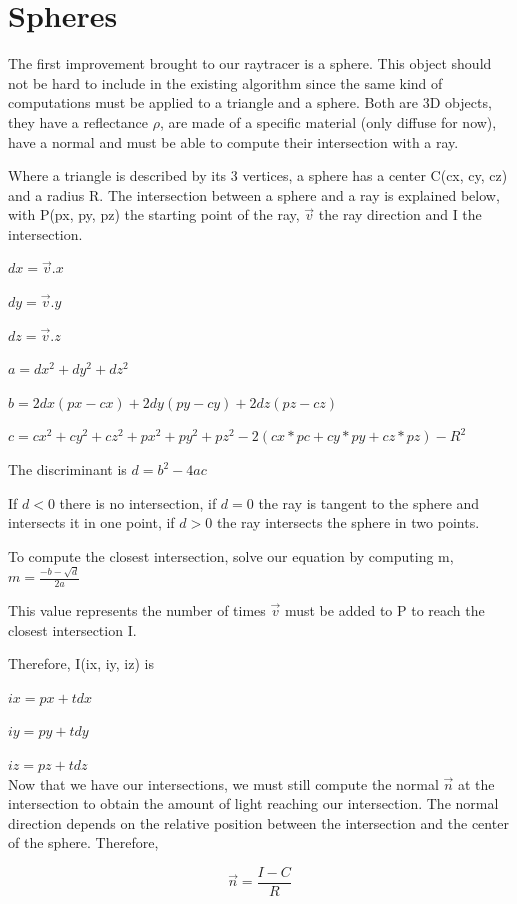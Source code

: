\section{Spheres}
The first improvement brought to our raytracer is a sphere. This object should not be hard to include in the existing algorithm since the same kind of computations must be applied to a triangle and a sphere. Both are 3D objects, they have a reflectance $\rho$, are made of a specific material (only diffuse for now), have a normal and must be able to compute their intersection with a ray.

Where a triangle is described by its 3 vertices, a sphere has a center C(cx, cy, cz) and a radius R. The intersection between a sphere and a ray is explained below, with P(px, py, pz) the starting point of the ray, $\vec{v}$ the ray direction and I the intersection.

$dx = \vec{v}.x$

$dy = \vec{v}.y$

$dz = \vec{v}.z$

$a = dx^2 + dy^2 + dz^2$

$b = 2 dx (px - cx) + 2 dy (py - cy) + 2 dz (pz - cz)$

$c =  cx^2 + cy^2 + cz^2 + px^2 + py^2 + pz^2 - 2 (cx * pc + cy * py + cz * pz) - R^2$

The discriminant is $d = b^2 - 4 a c$

If $d < 0$ there is no intersection, if $d = 0$ the ray is tangent to the sphere and intersects it in one point, if $d > 0$ the ray intersects the sphere in two points.

To compute the closest intersection, solve our equation by computing m, $m = \frac{-b -\sqrt{d}}{2a}$

This value represents the number of times $\vec{v}$ must be added to P to reach the closest intersection I.

Therefore, I(ix, iy, iz) is

$ix = px + t dx$

$iy = py + t dy$

$iz = pz + t dz$\\


Now that we have our intersections, we must still compute the normal $\vec{n}$ at the intersection to obtain the amount of light reaching our intersection. The normal direction depends on the relative position between the intersection and the center of the sphere. Therefore,

\begin{equation}
\vec{n} = \frac{I - C}{R}
\end{equation}

